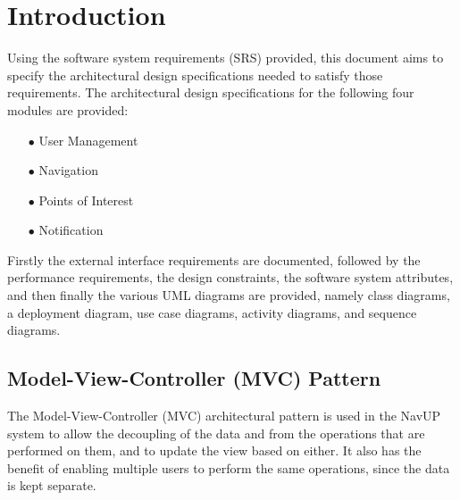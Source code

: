 \documentclass[english]{article}
\begin{document}
	\section{Introduction}
		Using the software system requirements (SRS) provided, this document aims to specify the architectural design specifications needed to satisfy those requirements.
	\newline
	\newline
		The architectural design specifications for the following four modules are provided:
	\begin{itemize}
		\item[$\bullet$] User Management
		\item[$\bullet$] Navigation
		\item[$\bullet$] Points of Interest
		\item[$\bullet$] Notification
	\end{itemize}
	\medskip
	Firstly the external interface requirements are documented, followed by the performance requirements, the design constraints, the software system attributes, and then finally the various UML diagrams are provided, namely class diagrams, a deployment diagram, use case diagrams, activity diagrams, and sequence diagrams.
	
	\subsection{Model-View-Controller (MVC) Pattern}
	The Model-View-Controller (MVC) architectural pattern is used in the NavUP system to allow the decoupling of the data and from the operations that are performed on them, and to update the view based on either.
	\newline
	\newline
	It also has the benefit of enabling multiple users to perform the same operations, since the data is kept separate.
		
\end{document}
